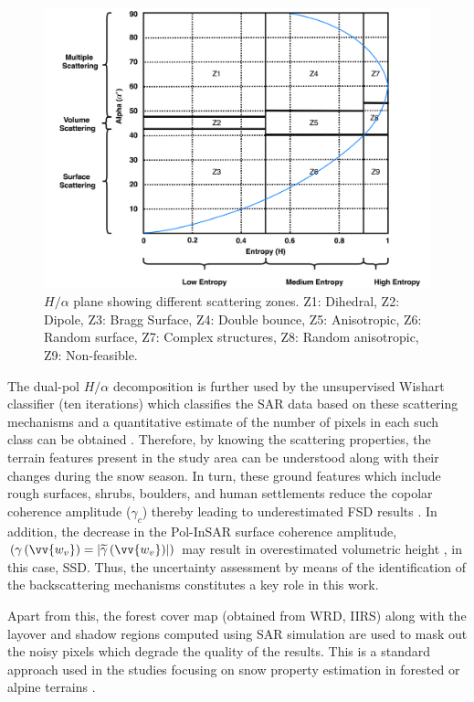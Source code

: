 \documentclass[review]{elsarticle}
\numberwithin{equation}{section}
\numberwithin{figure}{section}
\numberwithin{table}{section}
\begin{document}
\begin{figure}[htb]
    \centering
    \includegraphics[width=\textwidth]{Figures/Methods/HA.png}
    \caption{$H/{\alpha}$ plane showing different scattering zones. Z1: Dihedral, Z2: Dipole, Z3: Bragg Surface, Z4: Double
bounce, Z5: Anisotropic, Z6: Random surface, Z7: Complex structures, Z8: Random anisotropic, Z9: Non-feasible.}
    \label{fig:ha}
\end{figure}

The dual-pol $H/{\alpha}$ decomposition is further used by the unsupervised Wishart classifier (ten iterations) which classifies the SAR data based on these scattering mechanisms and a quantitative estimate of the number of pixels in each such class can be obtained \citep{Cloude2010, Lee2009}. Therefore, by knowing the scattering properties, the terrain features present in the study area can be understood along with their changes during the snow season. In turn, these ground features which include rough surfaces, shrubs, boulders, and human settlements reduce the copolar coherence amplitude ($\gamma_c$) thereby leading to underestimated FSD results \citep{Leinss2014, Leinss2016}. In addition, the decrease in the Pol-InSAR surface coherence amplitude, $\left(\gamma\left(\vv{w_v}\right) = \left\lvert\widetilde{\gamma}\left(\vv{w_v}\right)\right\rvert\right)$ may result in overestimated volumetric height \citep{Cloude2010, Hajnsek2009, Kugler2015}, in this case, SSD. Thus, the uncertainty assessment by means of the identification of the backscattering mechanisms constitutes a key role in this work.

Apart from this, the forest cover map (obtained from WRD, IIRS) along with the layover and shadow regions computed using SAR simulation are used to mask out the noisy pixels which degrade the quality of the results. This is a standard approach used in the studies focusing on snow property estimation in forested or alpine terrains \citep{Leinss2014, Leinss2016, Singh2017, Thakur2012, Usami2016}.
\end{document}
